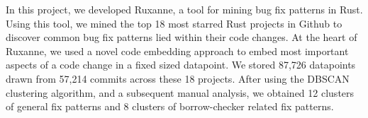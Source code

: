 In this project, we developed Ruxanne, a tool for mining bug fix patterns in Rust. Using this tool, we mined the top 18 most starred Rust projects in Github to discover common bug fix patterns lied within their code changes. At the heart of Ruxanne, we used a novel code embedding approach to embed most important aspects of a code change in a fixed sized datapoint. We stored 87,726 datapoints drawn from 57,214 commits across these 18 projects. After using the DBSCAN clustering algorithm, and a subsequent manual analysis, we obtained 12 clusters of general fix patterns and 8 clusters of borrow-checker related fix patterns.
